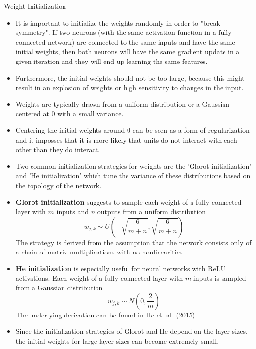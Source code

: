 \begin{vbframe}{Weight Initialization}
  \begin{itemize}
    \item It is important to initialize the weights randomly in order to "break symmetry". If two neurons (with the same activation function in a fully connected network) are connected to the same inputs and have the same initial weights, then both neurons will have the same gradient update in a given iteration and they will end up learning the same features.
    \item Furthermore, the initial weights should not be too large, because this might result in an explosion of weights or high sensitivity to changes in the input.
    \item Weights are typically drawn from a uniform distribution or a Gaussian centered at 0 with a small variance.
    \item Centering the initial weights around 0 can be seen as a form of regularization and it imposses that it is more likely that units do not interact with each other than they do interact.
    \framebreak
    \item Two common initialization strategies for weights are the 'Glorot initialization' and 'He initialization' which tune the variance of these distributions based on the topology of the network. %
    \item \textbf{Glorot initialization} suggests to sample each weight of a fully connected layer with $m$ inputs and $n$ outputs from a uniform distribution
    \begin{equation*}
      w_{j,k} \sim U\left(-\sqrt{\frac{6}{m+n}},\sqrt{\frac{6}{m+n}}\right)
    \end{equation*}
   The strategy is derived from the assumption that the network consists only of a chain of matrix multiplications with no nonlinearities. 
    \item \textbf{He initialization} is especially useful for neural networks with ReLU activations. Each weight of a fully connected layer with $m$ inputs is sampled from a Gaussian distribution 
    \begin{equation*}
      w_{j, k} \sim N\left(0, \frac{2}{m}\right)
    \end{equation*}
    The underlying derivation can be found in He et. al. (2015).
    \item Since the initialization strategies of Glorot and He depend on the layer sizes, the initial weights for large layer sizes can become extremely small.

\end{itemize}
\end{vbframe}
